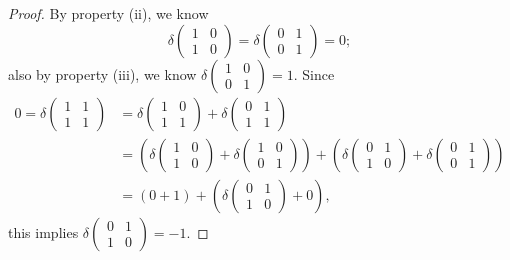 \begin{Exercise}
\begin{proof}
		By property (ii), we know 
		$$
		\delta\begin{pmatrix}
		1 & 0 \\
		1 & 0
		\end{pmatrix} = \delta\begin{pmatrix}
		0 & 1 \\
		0 & 1
		\end{pmatrix} = 0;
		$$
		also by property (iii), we know $\delta\begin{pmatrix}
		1 & 0 \\
		0 & 1
		\end{pmatrix} = 1$. Since
		\begin{align*}
		0 = \delta\begin{pmatrix}
		1 & 1 \\
		1 & 1
		\end{pmatrix} 
		&= \delta\begin{pmatrix}
		1 & 0 \\
		1 & 1
		\end{pmatrix} + \delta\begin{pmatrix}
		0 & 1 \\
		1 & 1
		\end{pmatrix} \\
		&= \left( \delta\begin{pmatrix}
		1 & 0 \\
		1 & 0
		\end{pmatrix} + \delta\begin{pmatrix}
		1 & 0 \\
		0 & 1
		\end{pmatrix} \right) + \left( \delta\begin{pmatrix}
		0 & 1 \\
		1 & 0
		\end{pmatrix} + \delta\begin{pmatrix}
		0 & 1 \\
		0 & 1
		\end{pmatrix} \right) \\
		&= ( 0 + 1 ) + \left(\delta\begin{pmatrix}
		0 & 1 \\
		1 & 0
		\end{pmatrix} + 0 \right),
		\end{align*}
		this implies $\delta\begin{pmatrix}
		0 & 1 \\
		1 & 0
		\end{pmatrix} = -1$.
		

\end{proof}
\end{Exercise}
